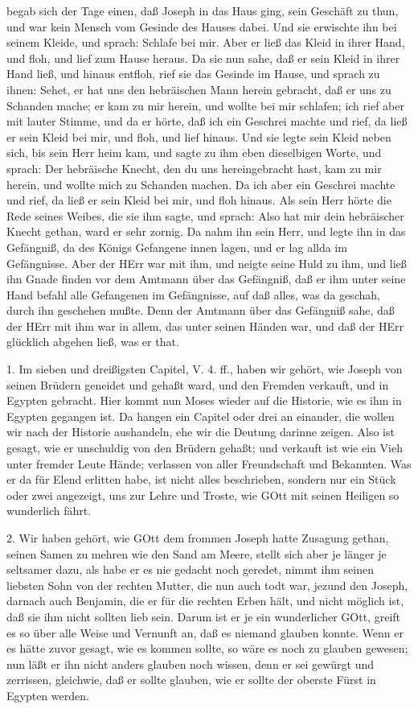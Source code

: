 begab sich der Tage einen, daß Joseph in das Haus ging, sein Geschäft zu thun, und war kein Mensch vom Gesinde des Hauses dabei. Und sie erwischte ihn bei seinem Kleide, und sprach: Schlafe bei mir. Aber er ließ das Kleid in ihrer Hand, und floh, und lief zum Hause heraus. Da sie nun sahe, daß er sein Kleid in ihrer Hand ließ, und hinaus entfloh, rief sie das Gesinde im Hause, und sprach zu ihnen: Sehet, er hat uns den hebräischen Mann herein gebracht, daß er uns zu Schanden mache; er kam zu mir herein, und wollte bei mir schlafen; ich rief aber mit lauter Stimme, und da er hörte, daß ich ein Geschrei machte und rief, da ließ er sein Kleid bei mir, und floh, und lief hinaus. Und sie legte sein Kleid neben sich, bis sein Herr heim kam, und sagte zu ihm eben dieselbigen Worte, und sprach: Der hebräische Knecht, den du uns hereingebracht hast, kam zu mir herein, und wollte mich zu Schanden machen. Da ich aber ein Geschrei machte und rief, da ließ er sein Kleid bei mir, und floh hinaus. Als sein Herr hörte die Rede seines Weibes, die sie ihm sagte, und sprach: Also hat mir dein hebräischer Knecht gethan, ward er sehr zornig. Da nahm ihn sein Herr, und legte ihn in das Gefängniß, da des Königs Gefangene innen lagen, und er lag allda im Gefängnisse. Aber der HErr war mit ihm, und neigte seine Huld zu ihm, und ließ ihn Gnade finden vor dem Amtmann über das Gefängniß, daß er ihm unter seine Hand befahl alle Gefangenen im Gefängnisse, auf daß alles, was da geschah, durch ihn geschehen mußte. Denn der Amtmann über das Gefängniß sahe, daß der HErr mit ihm war in allem, das unter seinen Händen war, und daß der HErr glücklich abgehen ließ, was er that.

1. Im sieben und dreißigsten Capitel, V. 4. ff., haben wir gehört, wie Joseph von seinen Brüdern geneidet und gehaßt ward, und den Fremden verkauft, und in Egypten gebracht. Hier kommt nun Moses wieder auf die Historie, wie es ihm in Egypten gegangen ist. Da hangen ein Capitel oder drei an einander, die wollen wir nach der Historie aushandeln, ehe wir die Deutung darinne zeigen. Also ist gesagt, wie er unschuldig von den Brüdern gehaßt; und verkauft ist wie ein Vieh unter fremder Leute Hände; verlassen von aller Freundschaft und Bekannten. Was er da für Elend erlitten habe, ist nicht alles beschrieben, sondern nur ein Stück oder zwei angezeigt, uns zur Lehre und Troste, wie GOtt mit seinen Heiligen so wunderlich fährt.

2. Wir haben gehört, wie GOtt dem frommen Joseph hatte Zusagung gethan, seinen Samen zu mehren wie den Sand am Meere, stellt sich aber je länger je seltsamer dazu, als habe er es nie gedacht noch geredet, nimmt ihm seinen liebsten Sohn von der rechten Mutter, die nun auch todt war, jezund den Joseph, darnach auch Benjamin, die er für die rechten Erben hält, und nicht möglich ist, daß sie ihm nicht sollten lieb sein. Darum ist er je ein wunderlicher GOtt, greift es so über alle Weise und Vernunft an, daß es niemand glauben konnte. Wenn er es hätte zuvor gesagt, wie es kommen sollte, so wäre es noch zu glauben gewesen; nun läßt er ihn nicht anders glauben noch wissen, denn er sei gewürgt und zerrissen, gleichwie, daß er sollte glauben, wie er sollte der oberste Fürst in Egypten werden.

